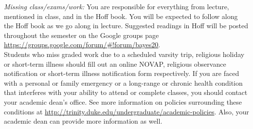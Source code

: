 \documentclass[11pt]{article}
\begin{document}
%
%



\emph{Missing class/exams/work:}
You are responsible for everything from lecture, mentioned in class, and in the Hoff book. You will be expected to follow along the Hoff book as we go along in lecture. Suggested readings in Hoff will be posted throughout the semester on the Google groups page \url{https://groups.google.com/forum/#!forum/bayes20}.  \\

Students who miss graded work due to a scheduled varsity trip, religious holiday or short-term illness should fill out an online NOVAP, religious observance notification or short-term illness notification form respectively. If you are faced with a personal or family emergency or a long-range or chronic health condition that interferes with your ability to attend or complete classes, you should contact your academic dean's office. See more information on policies surrounding these conditions at \url{http://trinity.duke.edu/undergraduate/academic-policies}. Also, your academic dean can provide more information as well.\\
\end{document}

